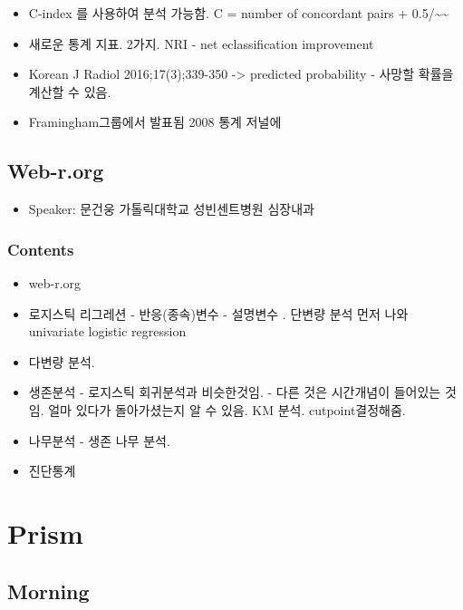 \documentclass[]{book}
\providecommand{\tightlist}{%
  \setlength{\itemsep}{0pt}\setlength{\parskip}{0pt}}
\begin{document}
\begin{itemize}
\tightlist
\item
  C-index 를 사용하여 분석 가능함. C = number of concordant pairs +
  0.5/\textasciitilde{}\textasciitilde{}
\item
  새로운 통계 지표. 2가지. NRI - net eclassification improvement
\item
  Korean J Radiol 2016;17(3);339-350 -\textgreater{} predicted
  probability - 사망할 확률을 계산할 수 있음.
\item
  Framingham그룹에서 발표됨 2008 통계 저널에
\end{itemize}

\section{Web-r.org}\label{web-r.org}

\begin{itemize}
\tightlist
\item
  Speaker: 문건웅 가톨릭대학교 성빈센트병원 심장내과
\end{itemize}

\subsection{Contents}\label{contents-2}

\begin{itemize}
\tightlist
\item
  web-r.org
\item
  로지스틱 리그레션 - 반응(종속)변수 - 설명변수 . 단변량 분석 먼저 나와
  univariate logistic regression
\item
  다변량 분석.
\item
  생존분석 - 로지스틱 회귀분석과 비슷한것임. - 다른 것은 시간개념이
  들어있는 것임. 얼마 있다가 돌아가셨는지 알 수 있음. KM 분석.
  cutpoint결정해줌.
\item
  나무분석 - 생존 나무 분석.
\item
  진단통계
\end{itemize}

\chapter{Prism}\label{prism}

\section{Morning}\label{morning}
\end{document}
